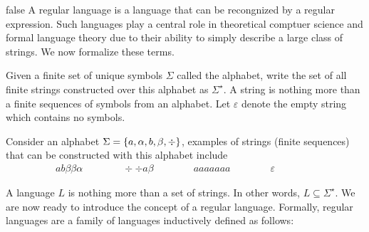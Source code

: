 \begin{example}[NFA]
\end{example}









\if false
A regular language is a language that can be recongnized by a regular
expression.
Such languages play a central role in theoretical comptuer science
and formal language theory due to their ability to simply describe a
large class of strings.
We now formalize these terms.

Given a finite set of unique symbols \(\Sigma\) called the alphabet,
write the set of all finite strings constructed over this alphabet
as \(\Sigma^\star\).
A string is nothing more than a finite sequences of symbols from an alphabet.
Let \(\varepsilon\) denote the empty string which contains no symbols.

\begin{example}
  Consider an alphabet \(\Sigma = \left\{a, \alpha, b, \beta, \div\right\}\),
  examples of strings (finite sequences) that can be constructed
  with this alphabet include
  \begin{align*}
    ab\beta\beta\alpha
      \qquad \qquad
    \div\div a \beta
      \qquad \qquad
    a a a a a a a
      \qquad \qquad
    \varepsilon
      \qquad \qquad
  \end{align*}
\end{example}

A language \(L\) is nothing more than a set of strings.
In other words, \(L \subseteq \Sigma^\star\).
We are now ready to introduce the concept of a regular language.
Formally, regular languages are a family of languages inductively
defined as follows:

